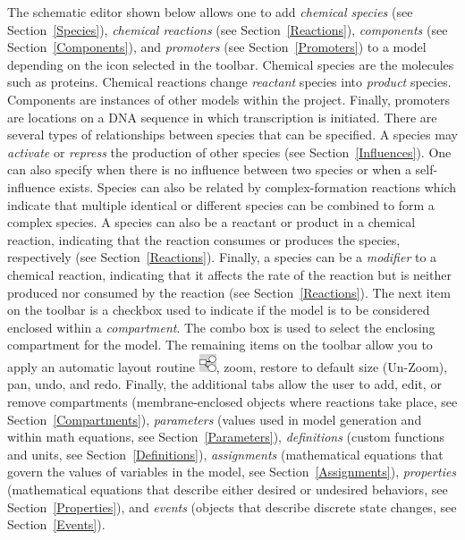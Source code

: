 \documentclass[titlepage,11pt]{article}
\begin{document}
\noindent
The schematic editor shown below allows one to add \emph{chemical species} (see Section~\ref{Species}), 
\emph{chemical reactions} (see Section~\ref{Reactions}), \emph{components} (see Section~\ref{Components}),
and \emph{promoters} (see Section~\ref{Promoters}) to a model depending on the icon selected in the toolbar.   Chemical species are the molecules such as proteins.  Chemical reactions change \emph{reactant} species into \emph{product} species.  Components are instances of other models within the project.  Finally, promoters are locations on a DNA sequence in which transcription is initiated.  
% 
There are several types of relationships between species that can be specified.  A species may \emph{activate} or \emph{repress} the production of other species (see Section~\ref{Influences}).  One can also specify when there is no influence between two species or when a self-influence exists.  Species can also be related by complex-formation reactions  which indicate that multiple identical or different species can be combined to form a complex species.  A species can also be a reactant or product in a chemical reaction, indicating that the reaction consumes or produces the species, respectively (see Section~\ref{Reactions}).  Finally, a species can be a \emph{modifier} to a chemical reaction, indicating that it affects the rate of the reaction but is neither produced nor consumed by the reaction (see Section~\ref{Reactions}).
%
The next item on the toolbar is a checkbox used to indicate if the model is to be considered enclosed within a \emph{compartment}.  The combo box is used to select the enclosing compartment for the model.  The remaining items on the toolbar allow you to apply an automatic layout routine \includegraphics{../gui/icons/modelview/choose_layout_selected}, zoom, restore to default size (Un-Zoom), pan, undo, and redo.
% 
Finally, the additional tabs allow the user to add, edit, or remove compartments (membrane-enclosed objects where reactions take place, see Section~\ref{Compartments}), \emph{parameters} (values used in model generation and within math equations, see Section~\ref{Parameters}), \emph{definitions} (custom functions and units, see Section~\ref{Definitions}), \emph{assignments} (mathematical equations that govern the values of variables in the model, see Section~\ref{Assignments}), \emph{properties} (mathematical equations that describe either desired or undesired behaviors, see Section~\ref{Properties}), and \emph{events} (objects that describe discrete state changes, see Section~\ref{Events}).
\end{document}
